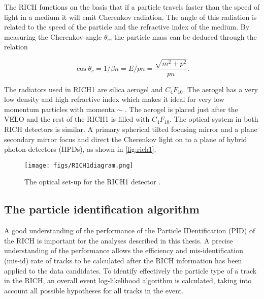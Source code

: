 The RICH functions on the basis that if a particle travels faster than the speed of light in a medium it will emit Cherenkov radiation. The angle of this radiation is related to the speed of the particle and the refractive index of the medium.  By measuring the Cherenkov angle $\theta_{c}$, the particle mass can be deduced through the relation

\begin{equation}
  \cos\theta_{c} = 1/\beta n  = E/pn =  \frac{\sqrt{m^{2} + p^{2}}}{pn}.
\end{equation}

The radiators used in RICH1 are silica aerogel and $C_{4}F_{10}$. The aerogel has a very low density and high refractive index which makes it ideal for very low momentum particles with momenta $\sim$ \gevc. The aerogel is placed just after the VELO and the rest of the RICH1 is filled with $C_{4}F_{10}$. The optical system in both RICH detectors is similar. A primary spherical tilted focusing mirror and a plane secondary mirror focus and direct the Cherenkov light on to a plane of hybrid photon detectors (HPDs), as shown in \autoref{fig:rich1}.


\begin{figure}[h!]
  \centering
  \texttt{[image: figs/RICH1diagram.png]} 
  \caption{The optical set-up for the RICH1 detector \cite{rich1dia}.
  }
  \label{fig:rich1}
\end{figure}


\subsection{The particle identification algorithm}
A good understanding of the performance of the Particle IDentification (\Gls{PID}) of the RICH is important for the analyses described in this thesis. A precise understanding of the performance  allows the efficiency and mis-identification (mis-id) rate of tracks to be calculated after the RICH information has been applied to the data candidates. To identify effectively the particle type of a track in the RICH, an overall event log-likelihood algorithm is calculated, taking into account all possible hypotheses for all tracks in the event. %

